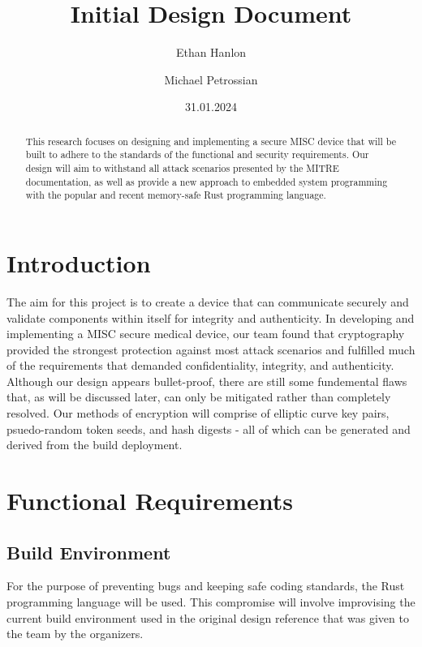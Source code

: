 \documentclass{prace}
\title{Initial Design Document}
\date{31.01.2024}
\author[1]{Ethan Hanlon}
\author[1]{Michael Petrossian}
\affiliation{San Francisco State University, 1600 Holloway Avenue, San Francisco, CA 94132, USA}
\begin{document}
\maketitle

\begin{abstract}
This research focuses on designing and implementing a secure MISC device that will be built to adhere to the standards of the functional and security requirements. Our design will 
aim to withstand all attack scenarios presented by the MITRE documentation, as well as provide a new approach to embedded system programming with the popular and recent memory-safe Rust programming language. 
\end{abstract}

\section{Introduction}

The aim for this project is to create a device that can communicate securely and validate components within itself for integrity and authenticity.
In developing and implementing a MISC secure medical device, our team found that cryptography
provided the strongest protection against most attack scenarios and fulfilled much of the requirements
that demanded confidentiality, integrity, and authenticity. Although our design appears bullet-proof, there are still
some fundemental flaws that, as will be discussed later, can only be mitigated rather than completely resolved. Our methods of encryption will comprise of elliptic curve key pairs, 
psuedo-random token seeds, and hash digests - all of which can be generated and derived from the build deployment.

\section{Functional Requirements}

\subsection{Build Environment}

For the purpose of preventing bugs and keeping safe coding standards, the Rust programming language will be used.
This compromise will involve improvising the current build environment used in the original design reference that was given to the team by the organizers.
\end{document}
